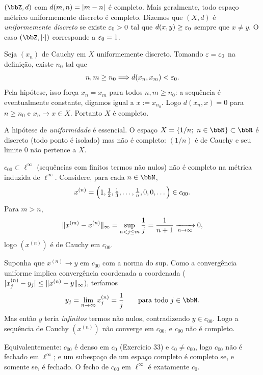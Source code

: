 \begin{exercicio}{$(\Z,d)$ com $d(m,n)=\lvert m-n\rvert$ é completo. Mais geralmente, todo espaço métrico uniformemente discreto é completo.}
\sol
Dizemos que $(X,d)$ é \emph{uniformemente discreto} se existe $\varepsilon_0>0$ tal que $d(x,y)\ge\varepsilon_0$ sempre que $x\neq y$. O caso $(\Z,\abs{\cdot})$ corresponde a $\varepsilon_0=1$.

Seja $(x_n)$ de Cauchy em $X$ uniformemente discreto. Tomando $\varepsilon=\varepsilon_0$ na definição, existe $n_0$ tal que
\[ n,m\ge n_0 \Longrightarrow d(x_n,x_m)<\varepsilon_0 . \]
Pela hipótese, isso força $x_n=x_m$ para todos $n,m\ge n_0$: a sequência é eventualmente constante, digamos igual a $x:=x_{n_0}$. Logo $d(x_n,x)=0$ para $n\ge n_0$ e $x_n\to x\in X$. Portanto $X$ é completo.

\begin{obs}
A hipótese de \emph{uniformidade} é essencial. O espaço $X=\{1/n;\ n\in\N\}\subset\R$ é discreto (todo ponto é isolado) mas não é completo: $(1/n)$ é de Cauchy e seu limite $0$ não pertence a $X$.
\end{obs}
\end{exercicio}

\begin{exercicio}{$c_{00}\subset \ell^\infty$ (sequências com finitos termos não nulos) não é completo na métrica induzida de $\ell^\infty$.}
\sol
Considere, para cada $n\in\N$,
\[ x^{(n)}=\Bigl(1,\tfrac12,\tfrac13,\dots,\tfrac1n,0,0,\dots\Bigr)\in c_{00}. \]
Para $m>n$,
\[ \lVert x^{(m)}-x^{(n)}\rVert_\infty=\sup_{n<j\le m}\frac1j=\frac{1}{n+1}\xrightarrow[n\to\infty]{}0, \]
logo $(x^{(n)})$ é de Cauchy em $c_{00}$.

Suponha que $x^{(n)}\to y$ em $c_{00}$ com a norma do sup. Como a convergência uniforme implica convergência coordenada a coordenada ($\lvert x^{(n)}_j-y_j\rvert\le\lVert x^{(n)}-y\rVert_\infty$), teríamos
\[ y_j=\lim_{n\to\infty}x^{(n)}_j=\frac1j \qquad\text{para todo } j\in\N. \]
Mas então $y$ teria \emph{infinitos} termos não nulos, contradizendo $y\in c_{00}$. Logo a sequência de Cauchy $(x^{(n)})$ não converge em $c_{00}$, e $c_{00}$ não é completo.

\begin{obs}
Equivalentemente: $c_{00}$ é denso em $c_0$ (Exercício 33) e $c_0\neq c_{00}$, logo $c_{00}$ não é fechado em $\ell^\infty$; e um subespaço de um espaço completo é completo se, e somente se, é fechado. O fecho de $c_{00}$ em $\ell^\infty$ é exatamente $c_0$.
\end{obs}
\end{exercicio}

